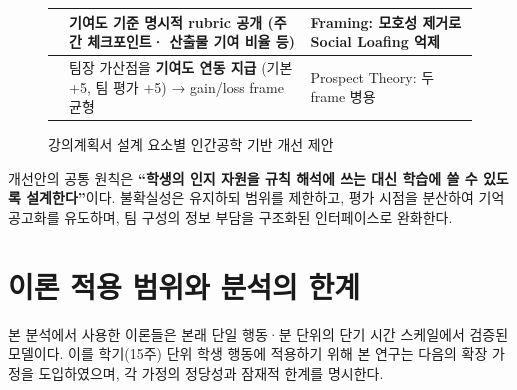 \documentclass[a4paper,11pt]{article}
\begin{document}
\begin{figure}[H]
\begin{tabularx}{\linewidth}{|>{\centering\arraybackslash}p{2.2cm}|X|>{\centering\arraybackslash}p{3.8cm}|}
\multirow{2}{2.2cm}{\centering\cellcolor{lightorange!80}\textbf{인센티브}}
  & \cellcolor{lightorange!40} 기여도 기준 \textbf{명시적 rubric} 공개 (주간 체크포인트·
    산출물 기여 비율 등)
  & \cellcolor{lightorange!40}\footnotesize Framing: 모호성 제거로 Social Loafing 억제 \\
\cline{2-3}
  & \cellcolor{lightorange!20} 팀장 가산점을 \textbf{기여도 연동 지급} (기본 +5, 팀 평가 +5)
    → gain/loss frame 균형
  & \cellcolor{lightorange!20}\footnotesize Prospect Theory: 두 frame 병용 \\
\hline
\end{tabularx}
\caption{강의계획서 설계 요소별 인간공학 기반 개선 제안}
\end{figure}

\vspace{2pt}

개선안의 공통 원칙은 \textbf{``학생의 인지 자원을 규칙 해석에 쓰는 대신 학습에 쓸 수
있도록 설계한다''}이다. 불확실성은 유지하되 범위를 제한하고, 평가 시점을 분산하여
기억 공고화를 유도하며, 팀 구성의 정보 부담을 구조화된 인터페이스로 완화한다.

\section{이론 적용 범위와 분석의 한계}

본 분석에서 사용한 이론들은 본래 단일 행동·분 단위의 단기 시간 스케일에서 검증된
모델이다. 이를 학기(15주) 단위 학생 행동에 적용하기 위해 본 연구는 다음의 확장 가정을
도입하였으며, 각 가정의 정당성과 잠재적 한계를 명시한다.
\end{document}
